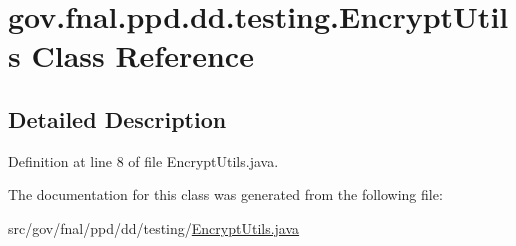 \hypertarget{classgov_1_1fnal_1_1ppd_1_1dd_1_1testing_1_1EncryptUtils}{\section{gov.\-fnal.\-ppd.\-dd.\-testing.\-Encrypt\-Utils Class Reference}
\label{classgov_1_1fnal_1_1ppd_1_1dd_1_1testing_1_1EncryptUtils}
}


\subsection{Detailed Description}


Definition at line 8 of file Encrypt\-Utils.\-java.



The documentation for this class was generated from the following file\-:\begin{DoxyCompactItemize}
\item 
src/gov/fnal/ppd/dd/testing/\hyperlink{EncryptUtils_8java}{Encrypt\-Utils.\-java}\end{DoxyCompactItemize}
